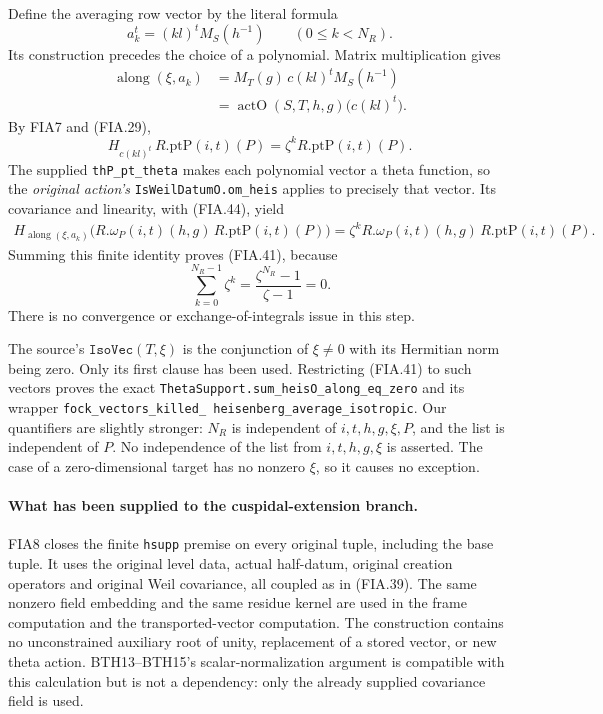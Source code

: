 Define the averaging row vector by the literal formula
\[
                         a_k^t=(kl)^t M_S(h^{-1})
                          \qquad(0\le k<N_R).
 \tag{FIA.43}
\]
Its construction precedes the choice of a polynomial.
Matrix multiplication gives
\[
 \begin{aligned}
 \operatorname{along}(\xi,a_k)
   &=M_T(g)\,c(kl)^tM_S(h^{-1})\\
   &=\operatorname{actO}(S,T,h,g)\bigl(c(kl)^t\bigr).
 \end{aligned}                                                     \tag{FIA.44}
\]
By FIA7 and (FIA.29),
\[
     H_{c(kl)^t}\,R.\mathrm{ptP}(i,t)(P)
                =\zeta^k R.\mathrm{ptP}(i,t)(P).
 \tag{FIA.45}
\]
The supplied \texttt{thP\_pt\_theta} makes each polynomial
vector a theta function, so the \emph{original action's}
\texttt{IsWeilDatumO.om\_heis} applies to precisely that
vector.  Its covariance and linearity, with (FIA.44), yield
\[
 \begin{split}
 H_{\operatorname{along}(\xi,a_k)}
   \bigl(R.\omega_P(i,t)(h,g)\,R.\mathrm{ptP}(i,t)(P)\bigr)
   =\zeta^k
       R.\omega_P(i,t)(h,g)\,R.\mathrm{ptP}(i,t)(P).
 \end{split}                                                       \tag{FIA.46}
\]
Summing this finite identity proves (FIA.41), because
\[
       \sum_{k=0}^{N_R-1}\zeta^k
                   =\frac{\zeta^{N_R}-1}{\zeta-1}=0 .
 \tag{FIA.47}
\]
There is no convergence or exchange-of-integrals issue in this
step.

The source's \(\texttt{IsoVec}(T,\xi)\) is the conjunction
of \(\xi\ne0\) with its Hermitian norm being zero.
Only its first clause has been used.  Restricting (FIA.41)
to such vectors proves the exact
\texttt{ThetaSupport.\allowbreak sum\_heisO\_\allowbreak along\_eq\_zero} and its
wrapper
\texttt{fock\_vectors\_\allowbreak killed\_\allowbreak
heisenberg\_\allowbreak average\_\allowbreak isotropic}.
Our quantifiers are slightly stronger: \(N_R\) is independent
of \(i,t,h,g,\xi,P\), and the list is independent of \(P\).
No independence of the list from \(i,t,h,g,\xi\) is asserted.
The case of a zero-dimensional target has no nonzero \(\xi\),
so it causes no exception.

\paragraph{What has been supplied to the cuspidal-extension branch.}
FIA8 closes the finite \texttt{hsupp} premise on every original
tuple, including the base tuple.  It uses the original level
data, actual half-datum, original creation operators and original
Weil covariance, all coupled as in (FIA.39).
The same nonzero field embedding and the same residue kernel
are used in the frame computation and the transported-vector
computation.  The construction contains no unconstrained
auxiliary root of unity, replacement of a stored vector, or
new theta action.  BTH13--BTH15's scalar-normalization argument
is compatible with this calculation but is not a dependency:
only the already supplied covariance field is used.

